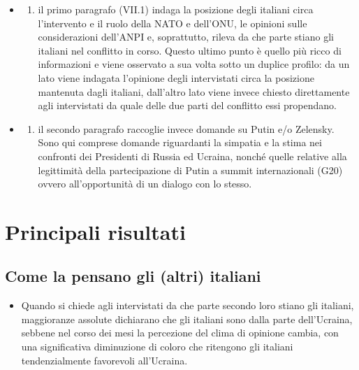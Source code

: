 \documentclass[
]{book}
\providecommand{\tightlist}{%
  \setlength{\itemsep}{0pt}\setlength{\parskip}{0pt}}
\begin{document}
\begin{itemize}
\item
  \begin{enumerate}
  \def\labelenumi{\alph{enumi})}
  \tightlist
  \item
    il primo paragrafo (VII.1) indaga la posizione degli italiani circa l'intervento e il ruolo della NATO e dell'ONU, le opinioni sulle considerazioni dell'ANPI e, soprattutto, rileva da che parte stiano gli italiani nel conflitto in corso. Questo ultimo punto è quello più ricco di informazioni e viene osservato a sua volta sotto un duplice profilo: da un lato viene indagata l'opinione degli intervistati circa la posizione mantenuta dagli italiani, dall'altro lato viene invece chiesto direttamente agli intervistati da quale delle due parti del conflitto essi propendano.
  \end{enumerate}
\item
  \begin{enumerate}
  \def\labelenumi{\alph{enumi})}
  \setcounter{enumi}{1}
  \tightlist
  \item
    il secondo paragrafo raccoglie invece domande su Putin e/o Zelensky. Sono qui comprese domande riguardanti la simpatia e la stima nei confronti dei Presidenti di Russia ed Ucraina, nonché quelle relative alla legittimità della partecipazione di Putin a summit internazionali (G20) ovvero all'opportunità di un dialogo con lo stesso.
  \end{enumerate}
\end{itemize}

\hypertarget{principali-risultati-5}{%
\section{Principali risultati}\label{principali-risultati-5}}

\hypertarget{come-la-pensano-gli-altri-italiani}{%
\subsection{Come la pensano gli (altri) italiani}\label{come-la-pensano-gli-altri-italiani}}

\begin{itemize}
\tightlist
\item
  Quando si chiede agli intervistati da che parte secondo loro stiano gli italiani, maggioranze assolute dichiarano che gli italiani sono dalla parte dell'Ucraina, sebbene nel corso dei mesi la percezione del clima di opinione cambia, con una significativa diminuzione di coloro che ritengono gli italiani tendenzialmente favorevoli all'Ucraina.
\end{itemize}
\end{document}

